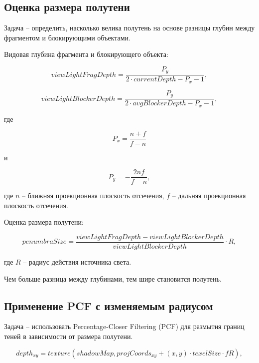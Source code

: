 \subsection*{Оценка размера полутени}

Задача -- определить, насколько велика полутень на основе разницы
глубин между фрагментом и блокирующими объектами.

Видовая глубина фрагмента и блокирующего объекта:

\begin{equation}
    \label{equ:view_depth_object}
    viewLightFragDepth = \frac{P_y}{2 \cdot currentDepth - P_x - 1},
\end{equation}

\begin{equation}
    \label{equ:view_depth_blocker}
    viewLightBlockerDepth = \frac{P_y}{2 \cdot avgBlockerDepth - P_x - 1},
\end{equation}

\noindent где

\[P_x = \frac{n + f}{f - n}\]

\noindent и

\[P_y = -\frac{2 n f}{f - n},\]

\noindent где $n$ -- ближняя проекционная плоскость отсечения,
$f$ -- дальняя проекционная плоскость отсечения.

Оценка размера полутени:

\begin{equation}
    \label{equ:penumbra}
    penumbraSize = \frac{viewLightFragDepth - viewLightBlockerDepth}{viewLightBlockerDepth} \cdot R,
\end{equation}

\noindent где $R$ -- радиус действия источника света.

Чем больше разница между глубинами, тем шире становится полутень.

\subsection*{Применение PCF с изменяемым радиусом}

Задача -- использовать Percentage-Closer Filtering (PCF) для размытия границ теней
в зависимости от размера полутени.

\begin{equation}
    \label{equ:depth_pcss}
    depth_{xy} = texture(shadowMap, projCoords_{xy} + (x,y) \cdot texelSize \cdot fR),
\end{equation}

